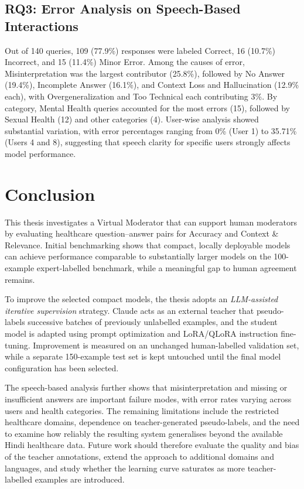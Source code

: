 \documentclass[11pt,a4paper]{article}
\begin{document}
\subsection{RQ3: Error Analysis on Speech-Based Interactions}
Out of 140 queries, 109 (77.9\%) responses were labeled Correct, 16 (10.7\%) Incorrect, and 15 (11.4\%) Minor Error. Among the causes of error, Misinterpretation was the largest contributor (25.8\%), followed by No Answer (19.4\%), Incomplete Answer (16.1\%), and Context Loss and Hallucination (12.9\% each), with Overgeneralization and Too Technical each contributing 3\%. By category, Mental Health queries accounted for the most errors (15), followed by Sexual Health (12) and other categories (4). User-wise analysis showed substantial variation, with error percentages ranging from 0\% (User 1) to 35.71\% (Users 4 and 8), suggesting that speech clarity for specific users strongly affects model performance.

\section{Conclusion}
\label{sec:conclusion}
This thesis investigates a Virtual Moderator that can support human moderators
by evaluating healthcare question--answer pairs for Accuracy and Context \&
Relevance. Initial benchmarking shows that compact, locally deployable models
can achieve performance comparable to substantially larger models on the
100-example expert-labelled benchmark, while a meaningful gap to human
agreement remains.

To improve the selected compact models, the thesis adopts an
\emph{LLM-assisted iterative supervision} strategy. Claude acts as an external
teacher that pseudo-labels successive batches of previously unlabelled
examples, and the student model is adapted using prompt optimization and
LoRA/QLoRA instruction fine-tuning. Improvement is measured on an unchanged
human-labelled validation set, while a separate 150-example test set is kept
untouched until the final model configuration has been selected.

The speech-based analysis further shows that misinterpretation and missing or
insufficient answers are important failure modes, with error rates varying
across users and health categories. The remaining limitations include the
restricted healthcare domains, dependence on teacher-generated pseudo-labels,
and the need to examine how reliably the resulting system generalises beyond
the available Hindi healthcare data. Future work should therefore evaluate the
quality and bias of the teacher annotations, extend the approach to additional
domains and languages, and study whether the learning curve saturates as more
teacher-labelled examples are introduced.
\end{document}
